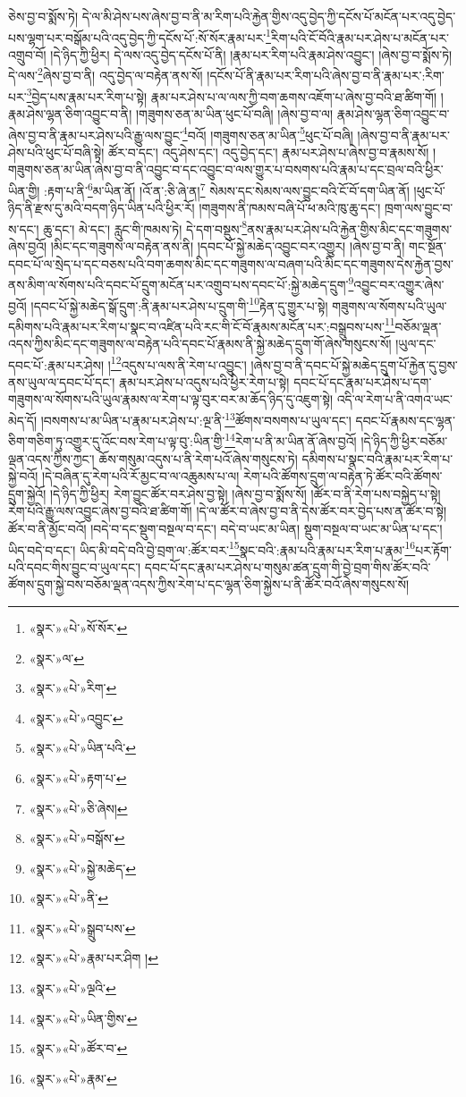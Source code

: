 ཅེས་བྱ་བ་སྨོས་ཏེ། དེ་ལ་མི་ཤེས་པས་ཞེས་བྱ་བ་ནི་མ་རིག་པའི་རྐྱེན་གྱིས་འདུ་བྱེད་ཀྱི་དངོས་པོ་མངོན་པར་འདུ་བྱེད་པས་ལྷག་པར་བསྒོམ་པའི་འདུ་བྱེད་ཀྱི་དངོས་པོ་:སོ་སོར་རྣམ་པར་\footnote{«སྣར་»«པེ་»སོ་སོར་}རིག་པའི་ངོ་བོའི་རྣམ་པར་ཤེས་པ་མངོན་པར་འགྲུབ་བོ། །དེ་ཉིད་ཀྱི་ཕྱིར། དེ་ལས་འདུ་བྱེད་དངོས་པོ་ནི། །རྣམ་པར་རིག་པའི་རྣམ་ཤེས་འབྱུང་། །ཞེས་བྱ་བ་སྨོས་ཏེ། དེ་ལས་\footnote{«སྣར་»ལ་}ཞེས་བྱ་བ་ནི། འདུ་བྱེད་ལ་བརྟེན་ནས་སོ། །དངོས་པོ་ནི་རྣམ་པར་རིག་པའི་ཞེས་བྱ་བ་ནི་རྣམ་པར་:རིག་པར་\footnote{«སྣར་»«པེ་»རིག་}བྱེད་པས་རྣམ་པར་རིག་པ་སྟེ། རྣམ་པར་ཤེས་པ་ལ་ལས་ཀྱི་བག་ཆགས་འཇོག་པ་ཞེས་བྱ་བའི་ཐ་ཚིག་གོ། །རྣམ་ཤེས་ལྷན་ཅིག་འབྱུང་བ་ནི། །གཟུགས་ཅན་མ་ཡིན་ཕུང་པོ་བཞི། །ཞེས་བྱ་བ་ལ། རྣམ་ཤེས་ལྷན་ཅིག་འབྱུང་བ་ཞེས་བྱ་བ་ནི་རྣམ་པར་ཤེས་པའི་རྒྱུ་ལས་བྱུང་\footnote{«སྣར་»«པེ་»འབྱུང་}བའོ། །གཟུགས་ཅན་མ་ཡིན་\footnote{«སྣར་»«པེ་»ཡིན་པའི་}ཕུང་པོ་བཞི། །ཞེས་བྱ་བ་ནི་རྣམ་པར་ཤེས་པའི་ཕུང་པོ་བཞི་སྟེ། ཚོར་བ་དང་། འདུ་ཤེས་དང་། འདུ་བྱེད་དང་། རྣམ་པར་ཤེས་པ་ཞེས་བྱ་བ་རྣམས་སོ། །གཟུགས་ཅན་མ་ཡིན་ཞེས་བྱ་བ་ནི་འབྱུང་བ་དང་འབྱུང་བ་ལས་གྱུར་པ་བསགས་པའི་རྣམ་པ་དང་བྲལ་བའི་ཕྱིར་ཡིན་གྱི། :རྟག་པ་ནི་\footnote{«སྣར་»«པེ་»རྟག་པ་}མ་ཡིན་ནོ། །འོ་ན་:ཅི་ཞེ་ན།\footnote{«སྣར་»«པེ་»ཅི་ཞེས།} སེམས་དང་སེམས་ལས་བྱུང་བའི་ངོ་བོ་དག་ཡིན་ནོ། །ཕུང་པོ་ཉིད་ནི་རྫས་དུ་མའི་བདག་ཉིད་ཡིན་པའི་ཕྱིར་རོ། །གཟུགས་ནི་ཁམས་བཞི་པོ་ཕ་མའི་ཁུ་ཆུ་དང་། ཁྲག་ལས་བྱུང་བ་ས་དང་། ཆུ་དང་། མེ་དང་། རླུང་གི་ཁམས་ཏེ། དེ་དག་བསྡུས་\footnote{«སྣར་»«པེ་»བསྒོས་}ནས་རྣམ་པར་ཤེས་པའི་རྐྱེན་གྱིས་མིང་དང་གཟུགས་ཞེས་བྱའོ། །མིང་དང་གཟུགས་ལ་བརྟེན་ནས་ནི། །དབང་པོ་སྐྱེ་མཆེད་འབྱུང་བར་འགྱུར། །ཞེས་བྱ་བ་ནི། གང་སྔོན་དབང་པོ་ལ་སྲེད་པ་དང་བཅས་པའི་བག་ཆགས་མིང་དང་གཟུགས་ལ་བཞག་པའི་མིང་དང་གཟུགས་དེས་རྐྱེན་བྱས་ནས་མིག་ལ་སོགས་པའི་དབང་པོ་དྲུག་མངོན་པར་འགྲུབ་པས་དབང་པོ་:སྐྱེ་མཆེད་དྲུག་\footnote{«སྣར་»«པེ་»སྐྱེ་མཆེད་}འབྱུང་བར་འགྱུར་ཞེས་བྱའོ། །དབང་པོ་སྐྱེ་མཆེད་སྒོ་དྲུག་:ནི་རྣམ་པར་ཤེས་པ་དྲུག་གི་\footnote{«སྣར་»«པེ་»ནི་}རྟེན་དུ་གྱུར་པ་སྟེ། གཟུགས་ལ་སོགས་པའི་ཡུལ་དམིགས་པའི་རྣམ་པར་རིག་པ་སྣང་བ་འཛིན་པའི་རང་གི་ངོ་བོ་རྣམས་མངོན་པར་:བསྒྲུབས་པས་\footnote{«སྣར་»«པེ་»སྒྲུབ་པས་}བཅོམ་ལྡན་འདས་ཀྱིས་མིང་དང་གཟུགས་ལ་བརྟེན་པའི་དབང་པོ་རྣམས་ནི་སྐྱེ་མཆེད་དྲུག་གོ་ཞེས་གསུངས་སོ། །ཡུལ་དང་དབང་པོ་:རྣམ་པར་ཤེས། །\footnote{«སྣར་»«པེ་»རྣམ་པར་ཤིག །}འདུས་པ་ལས་ནི་རེག་པ་འབྱུང་། །ཞེས་བྱ་བ་ནི་དབང་པོ་སྐྱེ་མཆེད་དྲུག་པོ་རྐྱེན་དུ་བྱས་ནས་ཡུལ་ལ་དབང་པོ་དང་། རྣམ་པར་ཤེས་པ་འདུས་པའི་ཕྱིར་རེག་པ་སྟེ། དབང་པོ་དང་རྣམ་པར་ཤེས་པ་དག་གཟུགས་ལ་སོགས་པའི་ཡུལ་རྣམས་ལ་རེག་པ་ལྟ་བུར་བར་མ་ཆོད་ཉིད་དུ་འཇུག་སྟེ། འདི་ལ་རེག་པ་ནི་འགའ་ཡང་མེད་དོ། །བསགས་པ་མ་ཡིན་པ་རྣམ་པར་ཤེས་པ་:ལྔ་ནི་\footnote{«སྣར་»«པེ་»ལྔའི་}ཚོགས་བསགས་པ་ཡུལ་དང་། དབང་པོ་རྣམས་དང་ལྷན་ཅིག་གཅིག་ཏུ་འགྱུར་དུ་འོང་བས་རེག་པ་ལྟ་བུ་:ཡིན་གྱི་\footnote{«སྣར་»«པེ་»ཡིན་གྱིས་}རེག་པ་ནི་མ་ཡིན་ནོ་ཞེས་བྱའོ། །དེ་ཉིད་ཀྱི་ཕྱིར་བཅོམ་ལྡན་འདས་ཀྱིས་ཀྱང་། ཆོས་གསུམ་འདུས་པ་ནི་རེག་པའོ་ཞེས་གསུངས་ཏེ། དམིགས་པ་སྣང་བའི་རྣམ་པར་རིག་པ་སྐྱེ་བའོ། །དེ་བཞིན་དུ་རེག་པའི་རོ་མྱང་བ་ལ་འཆུམས་པ་ལ། རེག་པའི་ཚོགས་དྲུག་ལ་བརྟེན་ཏེ་ཚོར་བའི་ཚོགས་དྲུག་སྐྱེའོ། །དེ་ཉིད་ཀྱི་ཕྱིར། རེག་བྱུང་ཚོར་བར་ཤེས་བྱ་སྟེ། །ཞེས་བྱ་བ་སྨོས་སོ། །ཚོར་བ་ནི་རེག་པས་བསྐྱེད་པ་སྟེ། རེག་པའི་རྒྱུ་ལས་འབྱུང་ཞེས་བྱ་བའི་ཐ་ཚིག་གོ། །དེ་ལ་ཚོར་བ་ཞེས་བྱ་བ་ནི་དེས་ཚོར་བར་བྱེད་པས་ན་ཚོར་བ་སྟེ། ཚོར་བ་ནི་མྱོང་བའོ། །བདེ་བ་དང་སྡུག་བསྔལ་བ་དང་། བདེ་བ་ཡང་མ་ཡིན། སྡུག་བསྔལ་བ་ཡང་མ་ཡིན་པ་དང་། ཡིད་བདེ་བ་དང་། ཡིད་མི་བདེ་བའི་བྱེ་བྲག་ལ་:ཚོར་བར་\footnote{«སྣར་»«པེ་»ཚོར་བ་}སྣང་བའི་:རྣམ་པའི་རྣམ་པར་རིག་པ་རྣམ་\footnote{«སྣར་»«པེ་»རྣམ་}པར་རྟོག་པའི་དབང་གིས་བྱུང་བ་ཡུལ་དང་། དབང་པོ་དང་རྣམ་པར་ཤེས་པ་གསུམ་ཚན་དྲུག་གི་བྱེ་བྲག་གིས་ཚོར་བའི་ཚོགས་དྲུག་སྐྱེ་བས་བཅོམ་ལྡན་འདས་ཀྱིས་རེག་པ་དང་ལྷན་ཅིག་སྐྱེས་པ་ནི་ཚོར་བའོ་ཞེས་གསུངས་སོ། 
